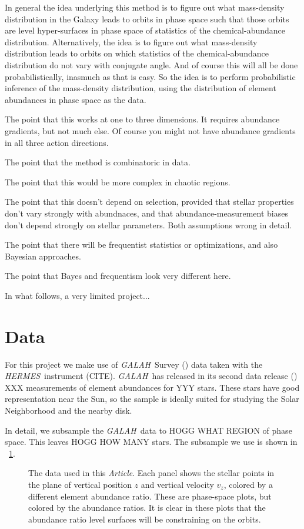 \documentclass[modern]{aastex62}
\newcommand{\documentname}{\textsl{Article}}
\newcommand{\acronym}[1]{{\small{#1}}}
\newcommand{\project}[1]{\textsl{#1}}
\newcommand{\galah}{\project{\acronym{GALAH}}}
\newcommand{\hermes}{\project{\acronym{HERMES}}}
\begin{document}
In general the idea underlying this method is to figure out what mass-density distribution
in the Galaxy leads to orbits in phase space such that those orbits are level
hyper-surfaces in phase space of statistics of the chemical-abundance distribution.
Alternatively, the idea is to figure out what mass-density distribution leads to orbits
on which statistics of the chemical-abundance distribution do not vary with conjugate
angle.
And of course this will all be done probabilistically, inasmuch as that is easy.
So the idea is to perform probabilistic inference of the mass-density distribution, using
the distribution of element abundances in phase space as the data.

The point that this works at one to three dimensions. It requires abundance gradients, but
not much else. Of course you might not have abundance gradients in all three action directions.

The point that the method is combinatoric in data.

The point that this would be more complex in chaotic regions.

The point that this doesn't depend on selection, provided that stellar properties don't vary
strongly with abundnaces, and that abundance-measurement biases don't depend strongly on stellar
parameters. Both assumptions wrong in detail.

The point that there will be frequentist statistics or optimizations, and also Bayesian
approaches.

The point that Bayes and frequentism look very different here.

In what follows, a very limited project...

\section{Data}

For this project we make use of \galah\ Survey (\citealt{galah, galah2}) data taken
with the \hermes\ instrument (CITE).
\galah\ has released in its second data release (\citealt{galahdr2})
XXX measurements of element abundances for YYY stars.
These stars have good representation near the Sun, so the sample is ideally suited for studying
the Solar Neighborhood and the nearby disk.

In detail, we subsample the \galah\ data to HOGG WHAT REGION of phase space.
This leaves HOGG HOW MANY stars.
The subsample we use is shown in \figurename~\ref{fig:data}.
\begin{figure}
\caption{The data used in this \documentname.
Each panel shows the stellar points in the plane
of vertical position $z$ and vertical velocity $v_z$,
colored by a different element abundance ratio.
These are phase-space plots, but colored by the abundance ratios.
It is clear in these plots that the abundance ratio level surfaces will be
constraining on the orbits.\label{fig:data}}
\end{figure}
\end{document}
